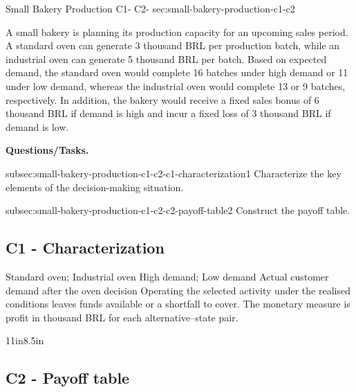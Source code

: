 	\sectionScored
	{Small Bakery Production}
	{C1- \hspace{2mm} C2-}
	{sec:small-bakery-production-c1-c2}
	{
		A small bakery is planning its production capacity for an upcoming sales period. A standard oven can generate 3 thousand BRL per production batch, while an industrial oven can generate 5 thousand BRL per batch. Based on expected demand, the standard oven would complete 16 batches under high demand or 11 under low demand, whereas the industrial oven would complete 13 or 9 batches, respectively. In addition, the bakery would receive a fixed sales bonus of 6 thousand BRL if demand is high and incur a fixed loss of 3 thousand BRL if demand is low.
		
		\textbf{Questions/Tasks.}
		\begin{enumerate}
			\CriterionTask
			{subsec:small-bakery-production-c1-c2-c1-characterization}{1}
			{Characterize the key elements of the decision-making situation. }
			
			\CriterionTask
			{subsec:small-bakery-production-c1-c2-c2-payoff-table}{2}
			{Construct the payoff table. }
		\end{enumerate}
		
		\label{subsec:small-bakery-production-c1-c2-c1-characterization}
		\subsection*{C1 - Characterization }
		
		\DecisionElementsTable
{Standard oven; Industrial oven}
{High demand; Low demand}
{Actual customer demand after the oven decision}
{Operating the selected activity under the realised conditions leaves funds available or a shortfall to cover. The monetary measure is profit in thousand BRL for each alternative--state pair.}

		
		\begin{CalculationLandscape}{11in}{8.5in}
		\label{subsec:small-bakery-production-c1-c2-c2-payoff-table}
		\subsection*{C2 - Payoff table }
		
		


\end{CalculationLandscape}}
